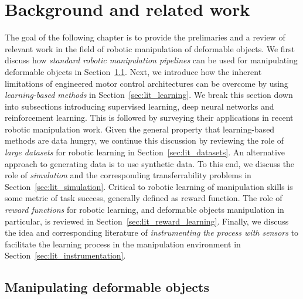\documentclass[\home/main.tex]{subfiles}
\begin{document}
\chapter{Background and related work}\label{ch:lit} 

The goal of the following chapter is to provide the prelimaries and a review of relevant work in the field of robotic manipulation of deformable objects. We first discuss how \emph{standard robotic manipulation pipelines} can be used for manipulating deformable objects in Section~\ref{sec:lit_traditional}. Next, we introduce how the inherent limitations of engineered motor control architectures can be overcome by using \emph{learning-based methods} in Section~\ref{sec:lit_learning}. We break this section down into subsections introducing supervised learning, deep neural networks and reinforcement learning. This is followed by surveying their applications in recent robotic manipulation work. Given the general property that learning-based methods are data hungry, we continue this discussion by reviewing the role of \emph{large datasets} for robotic learning in Section~\ref{sec:lit_datasets}. An alternative approach to generating data is to use synthetic data. To this end, we discuss the role of \emph{simulation} and the corresponding transferrability problems in Section~\ref{sec:lit_simulation}. Critical to robotic learning of manipulation skills is some metric of task success, generally defined as reward function. The role of \emph{reward functions} for robotic learning, and deformable objects manipulation in particular, is reviewed in Section~\ref{sec:lit_reward_learning}. Finally, we discuss the idea and corresponding literature of \emph{instrumenting the process with sensors} to facilitate the learning process in the manipulation environment in Section~\ref{sec:lit_instrumentation}.




\section{Manipulating deformable objects} \label{sec:lit_traditional}
\end{document}
